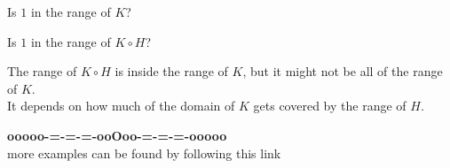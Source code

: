 \documentclass{ximera}
\begin{document}
\begin{question}



Is $1$ in the range of $K$?

\begin{multipleChoice}
\end{multipleChoice}





Is $1$ in the range of $K \circ H$?

\begin{multipleChoice}
\end{multipleChoice}


\end{question}



\begin{warning}


The range of $K \circ H$ is inside the range of $K$, but it might not be all of the range of $K$. \\


It depends on how much of the domain of $K$ gets covered by the range of $H$.


\end{warning}
























\begin{center}
\textbf{\textcolor{green!50!black}{ooooo-=-=-=-ooOoo-=-=-=-ooooo}} \\

more examples can be found by following this link\\ 

\end{center}
\end{document}
